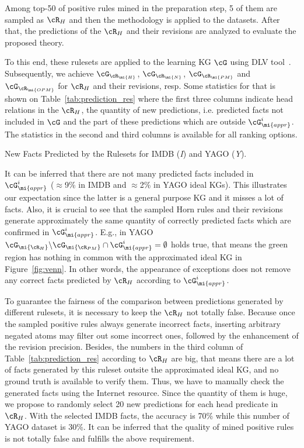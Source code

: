 Among top-50 of positive rules mined in the preparation step, 5 of them are sampled as $\cR_H$ and then the methodology is applied to the datasets. After that, the predictions of the $\cR_H$ and their revisions are analyzed to evaluate the proposed theory.

To this end, these rulesets are applied to the learning KG $\cG$ using DLV tool~\cite{dlv}. Subsequently, we achieve $\cG_{\cR_\mi{H}}$, $\cG_{\cR_\mi{N}}$, $\cG_{\cR_\mi{PM}}$ and $\cG_{\cR_\mi{OPM}}$ for $\cR_H$ and their revisions, resp. Some statistics for that is shown on Table~\ref{tab:prediction_res} where the first three columns indicate head relations in the $\cR_H$, the
quantity of new predictions, i.e. predicted facts not included in $\cG$ and the part of these predictions which are outside $\cG^i_{\mi{appr}}$. The statistics in the second and third columns is available for all ranking options.

\begin{table}[ht]
\centering

\smallskip
\caption{New Facts Predicted by the Rulesets for IMDB (\textit{I}) and YAGO (\textit{Y}).}
\label{tab:prediction_res}
\end{table}

It can be inferred that there are not many predicted facts included in $\cG^i_{\mi{appr}}$ ($\approx$9\% in IMDB and $\approx$2\% in YAGO ideal KGs). This illustrates our expectation since the latter is a general purpose KG and it misses a lot of facts. Also, it is crucial to see that the sampled Horn rules and their revisions generate approximately the same quantity of correctly predicted facts which are confirmed in $\cG^i_{\mi{appr}}$. E.g., in YAGO $\cG_{\mi{\cR_H}}\backslash \cG_{\mi{\cR_{PM}}} \cap \cG^i_{\mi{appr}}=\emptyset$ holds true, that means the green region has nothing in common with the approximated ideal KG in Figure~\ref{fig:venn}. In other words, the appearance of exceptions does not remove any correct facts predicted by $\cR_H$ according to $\cG^i_{\mi{appr}}$.

To guarantee the fairness of the comparison between predictions generated by different rulesets, it is necessary to keep the $\cR_H$ not totally false. Because once the sampled positive rules always generate incorrect facts, inserting arbitrary negated atoms may filter out some incorrect ones, followed by the enhancement of the revision precision. Besides, the numbers in the third column of Table~\ref{tab:prediction_res} according to $\cR_H$ are big, that means there are a lot of facts generated by this ruleset outsite the approximated ideal KG, and no ground truth is available to verify them. Thus, we have to manually check the generated facts using the Internet resource. Since the quantity of them is huge, we propose to randomly select 20 new predictions for each head predicate in $\cR_H$. With the selected IMDB facts, the accuracy is 70\% while this number of YAGO dataset is 30\%. It can be inferred that the quality of mined positive rules is not totally false and fulfills the above requirement.

